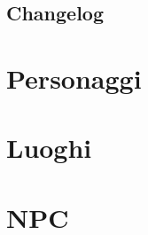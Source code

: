 \documentclass[12pt]{book}
\begin{document}
\section*{Changelog}

\chapter{Personaggi}

\chapter{Luoghi}
\chapter{NPC}
\end{document}
